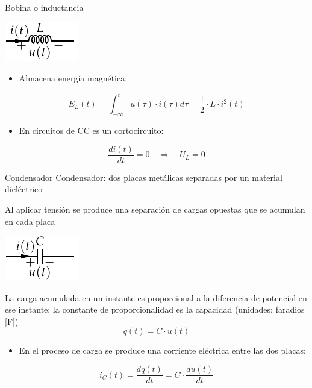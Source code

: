\documentclass[aspectratio=169, xcolor={usenames,svgnames,dvipsnames}]{beamer}
\begin{document}

\begin{frame}{Bobina o inductancia}
    \begin{center}
    \includegraphics[height=0.2\textheight]{../figs/Bobina.pdf}
    \end{center}
    
    \begin{itemize}
    \item Almacena \alert{energía magnética}:
    \end{itemize}
    \[
      E_L(t) = \int_{-\infty}^t u(\tau) \cdot i(\tau) d\tau = \frac{1}{2} \cdot L \cdot i^2(t)
    \]
    \begin{itemize}
    \item En circuitos de CC es un \alert{cortocircuito}:
    \end{itemize}
    \begin{equation*}
      \frac{di(t)}{dt} = 0 \quad \Rightarrow \quad U_L = 0
    \end{equation*}
\end{frame}


\begin{frame}{Condensador}
    \alert{Condensador}: dos placas metálicas separadas por un material dieléctrico 
    
    Al aplicar tensión se produce una \alert{separación de cargas opuestas} que se \alert{acumulan} en cada placa
    \begin{center}
    \includegraphics[height=0.2\textheight]{../figs/Condensador.pdf}
    \end{center}

    La \alert{carga acumulada} en un instante es \alert{proporcional} a la \alert{diferencia de potencial} en ese instante: la constante de proporcionalidad es la \alert{capacidad} (unidades: faradios [F])
    \[
    q(t) = C \cdot u(t)
    \]
    
    \begin{itemize}
    \item En el proceso de carga se produce una corriente eléctrica entre las dos placas:
    \end{itemize}
    \begin{equation*}
        i_C(t) = \frac{dq(t)}{dt} = \boxed{ C \cdot \frac{du(t)}{dt} } %
    \end{equation*}
\end{frame}
\end{document}
